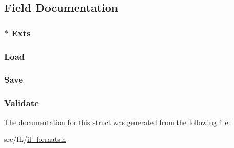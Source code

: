 \subsection{Field Documentation}
\hypertarget{struct_i_lformat_ac3cb8461b06aa42024436cc85002a160}{
\subsubsection[{Exts}]{$\ast$ Exts}}\label{struct_i_lformat_ac3cb8461b06aa42024436cc85002a160}
\hypertarget{struct_i_lformat_af88088c14ba8ceb50b8fd956af2510a9}{
\subsubsection[{Load}]{ Load}}\label{struct_i_lformat_af88088c14ba8ceb50b8fd956af2510a9}
\hypertarget{struct_i_lformat_ae6b7a35103d102d22852f5f84b2f561a}{
\subsubsection[{Save}]{ Save}}\label{struct_i_lformat_ae6b7a35103d102d22852f5f84b2f561a}
\hypertarget{struct_i_lformat_a2a3248b59dea172ddfa5ed87bf4ef26d}{
\subsubsection[{Validate}]{ Validate}}\label{struct_i_lformat_a2a3248b59dea172ddfa5ed87bf4ef26d}


The documentation for this struct was generated from the following file\-:\begin{DoxyCompactItemize}
\item 
src/\-I\-L/\hyperlink{il__formats_8h}{il\-\_\-formats.\-h}\end{DoxyCompactItemize}
